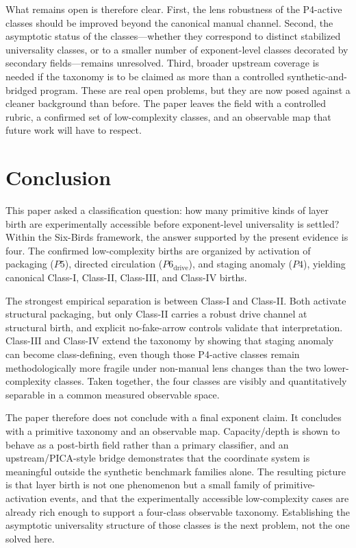 \documentclass[11pt]{article}
\begin{document}
What remains open is therefore clear. First, the lens robustness of the P4-active classes should be improved beyond the canonical manual channel. Second, the asymptotic status of the classes---whether they correspond to distinct stabilized universality classes, or to a smaller number of exponent-level classes decorated by secondary fields---remains unresolved. Third, broader upstream coverage is needed if the taxonomy is to be claimed as more than a controlled synthetic-and-bridged program. These are real open problems, but they are now posed against a cleaner background than before. The paper leaves the field with a controlled rubric, a confirmed set of low-complexity classes, and an observable map that future work will have to respect.
 \section{Conclusion}
\label{sec:conclusion}

This paper asked a classification question: how many primitive kinds of layer birth are experimentally accessible before exponent-level universality is settled? Within the Six-Birds framework, the answer supported by the present evidence is four. The confirmed low-complexity births are organized by activation of packaging ($P5$), directed circulation ($P6_{\mathrm{drive}}$), and staging anomaly ($P4$), yielding canonical Class-I, Class-II, Class-III, and Class-IV births.

The strongest empirical separation is between Class-I and Class-II. Both activate structural packaging, but only Class-II carries a robust drive channel at structural birth, and explicit no-fake-arrow controls validate that interpretation. Class-III and Class-IV extend the taxonomy by showing that staging anomaly can become class-defining, even though those P4-active classes remain methodologically more fragile under non-manual lens changes than the two lower-complexity classes. Taken together, the four classes are visibly and quantitatively separable in a common measured observable space.

The paper therefore does not conclude with a final exponent claim. It concludes with a primitive taxonomy and an observable map. Capacity/depth is shown to behave as a post-birth field rather than a primary classifier, and an upstream/PICA-style bridge demonstrates that the coordinate system is meaningful outside the synthetic benchmark families alone. The resulting picture is that layer birth is not one phenomenon but a small family of primitive-activation events, and that the experimentally accessible low-complexity cases are already rich enough to support a four-class observable taxonomy. Establishing the asymptotic universality structure of those classes is the next problem, not the one solved here.
 
\end{document}
